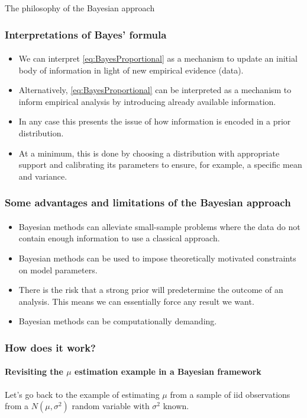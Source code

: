 \documentclass[10pt]{beamer}
\theoremstyle{definition}
\begin{document}
\begin{section}{The philosophy of the Bayesian approach}
\begin{frame}[fragile]
\frametitle{Interpretations of Bayes' formula}
\framesubtitle{}
\begin{itemize}\itemsep1em
\item We can interpret \eqref{eq:BayesProportional} as a mechanism to update an initial body of information in light of new empirical evidence (data).
\item Alternatively, \eqref{eq:BayesProportional} can be interpreted as a mechanism to inform empirical analysis by introducing already available information.
\item In any case this presents the issue of how information is encoded in a prior distribution.
\item At a minimum, this is done by choosing a distribution with appropriate support and calibrating its parameters to ensure, for example, a specific mean and variance.
\end{itemize}
\end{frame}

\begin{frame}[fragile]
\frametitle{Some advantages and limitations of the Bayesian approach}
\framesubtitle{}
\begin{itemize}\itemsep1em
\item Bayesian methods can alleviate small-sample problems where the data do not contain enough information to use a classical approach.
\item Bayesian methods can be used to impose theoretically motivated constraints on model parameters.
\item There is the risk that a strong prior will predetermine the outcome of an analysis. This means we can essentially force any result we want.
\item Bayesian methods can be computationally demanding.
\end{itemize}
\end{frame}

\begin{frame}[fragile]
\frametitle{How does it work?}
\framesubtitle{Revisiting the $ \mu $ estimation example in a Bayesian framework}
Let's go back to the example of estimating $ \mu $ from a sample of iid observations from a $N(\mu,\sigma^2)$ random variable with $ \sigma^2 $ known. \bigskip


\end{frame}
\end{section}
\end{document}
